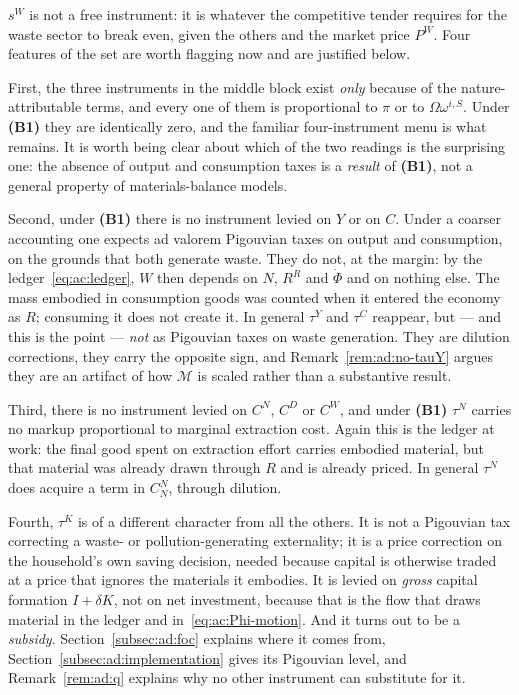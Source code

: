 $s^W$ is not a free instrument: it is whatever the competitive tender requires for the waste sector to break even, given the others and the market price $P^W$. Four features of the set are worth flagging now and are justified below.

First, the three instruments in the middle block exist \emph{only} because of the nature-attributable terms, and every one of them is proportional to $\pi$ or to $\Omega\omega^{i,S}$. Under \textbf{(B1)} they are identically zero, and the familiar four-instrument menu is what remains. It is worth being clear about which of the two readings is the surprising one: the absence of output and consumption taxes is a \emph{result} of \textbf{(B1)}, not a general property of materials-balance models.

Second, under \textbf{(B1)} there is no instrument levied on $Y$ or on $C$. Under a coarser accounting one expects ad valorem Pigouvian taxes on output and consumption, on the grounds that both generate waste. They do not, at the margin: by the ledger~\eqref{eq:ac:ledger}, $W$ then depends on $N$, $R^R$ and $\dot\Phi$ and on nothing else. The mass embodied in consumption goods was counted when it entered the economy as $R$; consuming it does not create it. In general $\tau^Y$ and $\tau^C$ reappear, but --- and this is the point --- \emph{not} as Pigouvian taxes on waste generation. They are dilution corrections, they carry the opposite sign, and Remark~\ref{rem:ad:no-tauY} argues they are an artifact of how $\mathcal M$ is scaled rather than a substantive result.

Third, there is no instrument levied on $C^N$, $C^D$ or $C^W$, and under \textbf{(B1)} $\tau^N$ carries no markup proportional to marginal extraction cost. Again this is the ledger at work: the final good spent on extraction effort carries embodied material, but that material was already drawn through $R$ and is already priced. In general $\tau^N$ does acquire a term in $C^N_N$, through dilution.

Fourth, $\tau^K$ is of a different character from all the others. It is not a Pigouvian tax correcting a waste- or pollution-generating externality; it is a price correction on the household's own saving decision, needed because capital is otherwise traded at a price that ignores the materials it embodies. It is levied on \emph{gross} capital formation $I+\delta K$, not on net investment, because that is the flow that draws material in the ledger and in~\eqref{eq:ac:Phi-motion}. And it turns out to be a \emph{subsidy}. Section~\ref{subsec:ad:foc} explains where it comes from, Section~\ref{subsec:ad:implementation} gives its Pigouvian level, and Remark~\ref{rem:ad:q} explains why no other instrument can substitute for it.

